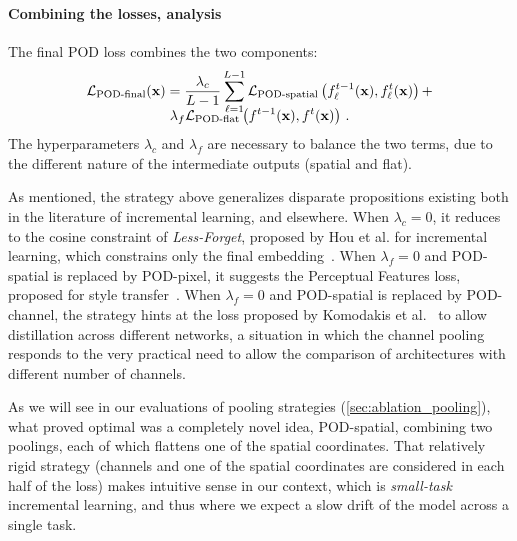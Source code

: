 \paragraph{Combining the losses, analysis} The final POD loss combines the two  components:
%
\begin{multline}
    \mathcal{L}_\text{POD-final}(\mathbf{x}) =  \frac{\lambda_{c}}{L-1}\sum_{\ell=1}^{L-1}  \mathcal{L}_{\text{POD-spatial}}\left(f^{t-1}_\ell(\mathbf{x}), f^t_\ell(\mathbf{x})\right) + \\[-0.8em]
    \lambda_{f} \mathcal{L}_\text{POD-flat}\left(f^{t-1}(\mathbf{x}), f^t(\mathbf{x})\right)\,.
\end{multline}
%
The hyperparameters $\lambda_{c}$ and $\lambda_{f}$ are necessary to balance the two terms, due to
the  different nature of the intermediate outputs (spatial and flat).

As mentioned, the strategy above generalizes disparate propositions existing both in the literature
of incremental learning, and elsewhere. When $\lambda_{c}=0$, it reduces to the cosine constraint of
\textit{Less-Forget}, proposed by Hou et al. for incremental learning, which constrains only the
final embedding~\cite{hou2019ucir}. When $\lambda_{f}=0$ and POD-spatial is replaced by POD-pixel,
it suggests the Perceptual Features loss, proposed for style
transfer~\cite{johnson2016perceptual_losses}. When $\lambda_{f}=0$ and POD-spatial is replaced by
POD-channel, the strategy hints at the loss proposed by Komodakis et
al.~\cite{komodakis2017attention_residual_distillation} to allow distillation across different
networks, a situation in which the channel pooling responds to the very practical need to allow the
comparison of architectures with different number of channels.

As we will see in our evaluations of pooling strategies (\autoref{sec:ablation_pooling}), what
proved optimal was a completely novel idea, POD-spatial, combining two poolings, each of which
flattens one of the spatial coordinates. That relatively rigid strategy (channels and one of the
spatial coordinates are considered in each half of the loss) makes intuitive sense in our context,
which is \textit{small-task} incremental learning, and thus where we expect a slow drift of the
model across a single task.


